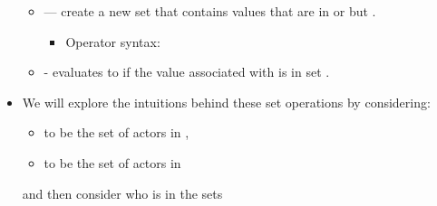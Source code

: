 \documentclass[letterpaper,10pt,english]{sphinxmanual}
\begin{document}
\begin{itemize}
\begin{itemize}
\begin{itemize}
\end{itemize}

\begin{sphinxVerbatim}[commandchars=\\\{\}]
  
\end{sphinxVerbatim}

\item {} 
 — create a new set that contains
values that are in  or  but .
\begin{itemize}
\item {} 
Operator syntax:

\end{itemize}

\begin{sphinxVerbatim}[commandchars=\\\{\}]
  
\end{sphinxVerbatim}

\item {} 
 - evaluates to  if the value associated with
 is in set .

\end{itemize}

\item {} 
We will explore the intuitions behind these set operations by
considering:
\begin{itemize}
\item {} 
 to be the set of actors in ,

\item {} 
 to be the set of actors in 

\end{itemize}

and then consider who is in the sets

\begin{sphinxVerbatim}[commandchars=\\\{\}]
  

  

  

  
\end{sphinxVerbatim}

\end{itemize}
\end{document}
